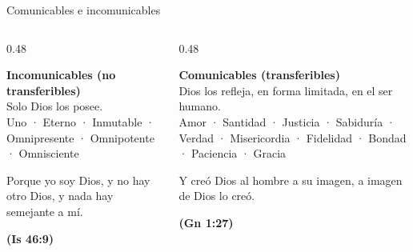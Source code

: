 \documentclass[hyperref={bookmarks=false},aspectratio=169]{beamer}
\newcommand{\fuente}[1]{\par\hfill{\upshape\bfseries\footnotesize\textcolor{azulp}{#1}}}
\begin{document}
\begin{frame}{Comunicables e incomunicables}
\begin{columns}[t,onlytextwidth]
\begin{column}{0.48\textwidth}
\begin{tcolorbox}[colback=azulp,colframe=azulp,coltext=white,boxrule=0pt,arc=3pt,fontupper=\small]
\textbf{Incomunicables (no transferibles)}\\[3pt] Solo Dios los posee.\\[3pt]
{\footnotesize Uno · Eterno · Inmutable · Omnipresente · Omnipotente · Omnisciente}
\end{tcolorbox}
\begin{cita}Porque yo soy Dios, y no hay otro Dios, y nada hay semejante a mí.\fuente{(Is 46:9)}\end{cita}
\end{column}
\begin{column}{0.48\textwidth}
\begin{tcolorbox}[colback=azulcl,colframe=azulp,boxrule=0.8pt,arc=3pt,fontupper=\small]
\textbf{Comunicables (transferibles)}\\[3pt] Dios los refleja, en forma limitada, en el ser humano.\\[3pt]
{\footnotesize Amor · Santidad · Justicia · Sabiduría · Verdad · Misericordia · Fidelidad · Bondad · Paciencia · Gracia}
\end{tcolorbox}
\begin{cita}Y creó Dios al hombre a su imagen, a imagen de Dios lo creó.\fuente{(Gn 1:27)}\end{cita}
\end{column}
\end{columns}
\end{frame}
\end{document}
